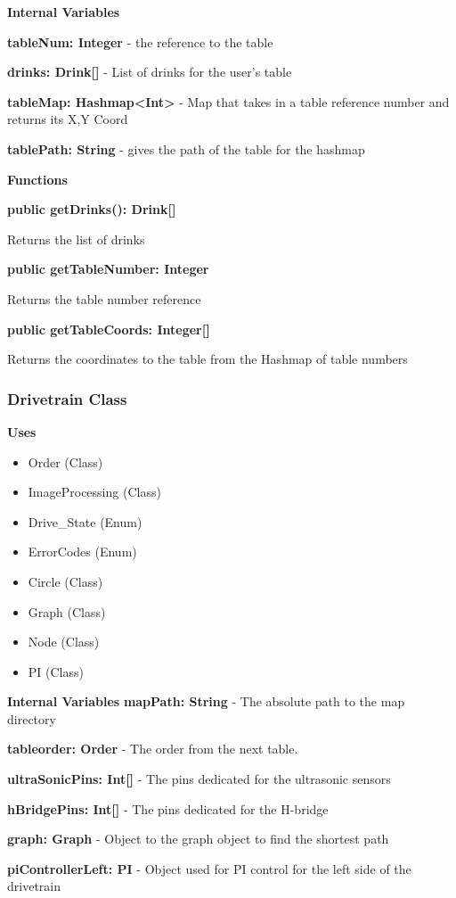 \documentclass [10pt]{article}
\begin{document}
\textbf{Internal Variables}

\textbf{tableNum: Integer} - the reference to the table

\textbf{drinks: Drink[]} - List of drinks for the user's table

\textbf{tableMap: Hashmap<Int>} -  Map that takes in a table reference number and returns its X,Y Coord

\textbf{tablePath: String} - gives the path of the table for the hashmap 

\textbf{Functions}

\textbf{public getDrinks(): Drink[]}

Returns the list of drinks

\textbf{public getTableNumber: Integer}

Returns the table number reference

\textbf{public getTableCoords: Integer[]}

Returns the coordinates to the table from the Hashmap of table numbers

\subsubsection{Drivetrain Class}
\textbf{Uses}
\begin{itemize}
	\item Order (Class)
	\item ImageProcessing (Class)
	\item Drive\_State (Enum)
	\item ErrorCodes (Enum)
	\item Circle (Class)
	\item Graph (Class)
	\item Node (Class)
	\item PI (Class)
\end{itemize}


\textbf{Internal Variables}
\textbf{mapPath: String} - The absolute path to the map directory

\textbf{tableorder: Order} - The order from the next table.

\textbf{ultraSonicPins: Int[]} - The pins dedicated for the ultrasonic sensors

\textbf{hBridgePins: Int[]} - The pins dedicated for the H-bridge

\textbf{graph: Graph} - Object to the graph object to find the shortest path

\textbf{piControllerLeft: PI} - Object used for PI control for the left side of the drivetrain
\end{document}
